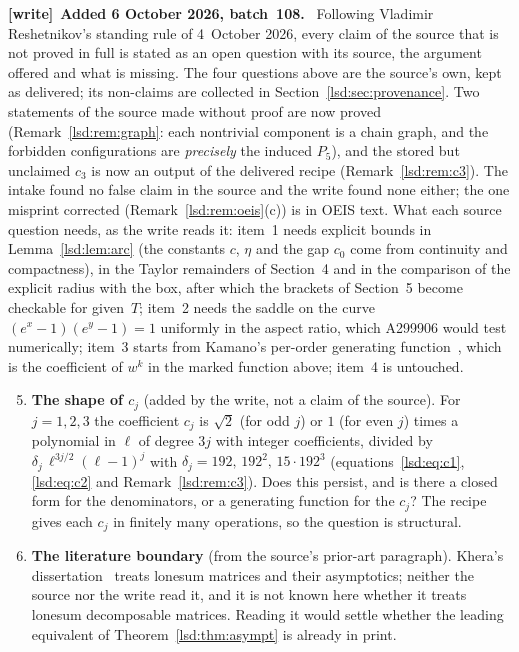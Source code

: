\documentclass[11pt]{article}
\theoremstyle{remark}\newtheorem{remark}{Remark}
\newenvironment{writenote}[1][]{\par\smallskip\begingroup\small
 \noindent\textbf{[write]}\if\relax\detokenize{#1}\relax\else~\textbf{#1.}\fi\ }%
 {\par\endgroup\smallskip}
\begin{document}
\begin{writenote}[Added 6 October 2026, batch~108]
Following Vladimir Reshetnikov's standing rule of 4~October 2026, every claim
of the source that is not proved in full is stated as an open question with
its source, the argument offered and what is missing. The four questions
above are the source's own, kept as delivered; its non-claims are collected in
Section~\ref{lsd:sec:provenance}. Two statements of the source made without
proof are now proved (Remark~\ref{lsd:rem:graph}: each nontrivial component is
a chain graph, and the forbidden configurations are \emph{precisely} the
induced $P_5$), and the stored but unclaimed $c_3$ is now an output of the
delivered recipe (Remark~\ref{lsd:rem:c3}). The intake found no false claim in
the source and the write found none either; the one misprint corrected
(Remark~\ref{lsd:rem:oeis}(c)) is in OEIS text. What each source question
needs, as the write reads it: item~1 needs explicit bounds in
Lemma~\ref{lsd:lem:arc} (the constants $c$, $\eta$ and the gap $c_0$ come from
continuity and compactness), in the Taylor remainders of Section~4 and in the
comparison of the explicit radius with the box, after which the brackets of
Section~5 become checkable for given~$T$; item~2 needs the saddle on the curve
$(e^x-1)(e^y-1)=1$ uniformly in the aspect ratio, which A299906 would test
numerically; item~3 starts from Kamano's per-order generating
function~\cite[Theorem~3.1, equation~(8)]{Kamano}, which is the coefficient of
$w^k$ in the marked function above; item~4 is untouched.
\end{writenote}
\begin{enumerate}
\setcounter{enumi}{4}
\item\label{lsd:q:pattern} \textbf{The shape of $c_j$} (added by the write,
 not a claim of the source). For $j=1,2,3$ the coefficient $c_j$ is
 $\sqrt2$ (for odd $j$) or $1$ (for even $j$) times a polynomial in $\ell$ of degree $3j$ with integer
 coefficients, divided by $\delta_j\,\ell^{3j/2}(\ell-1)^j$ with
 $\delta_j=192,\,192^2,\,15\cdot192^3$
 (equations~\eqref{lsd:eq:c1}, \eqref{lsd:eq:c2} and
 Remark~\ref{lsd:rem:c3}). Does this persist, and is there a closed form for
 the denominators, or a generating function for the $c_j$? The recipe gives
 each $c_j$ in finitely many operations, so the question is structural.
\item\label{lsd:q:literature} \textbf{The literature boundary} (from the
 source's prior-art paragraph). Khera's dissertation~\cite{KheraThesis}
 treats lonesum matrices and their asymptotics; neither the source nor the
 write read it, and it is not known here whether it treats lonesum
 decomposable matrices. Reading it would settle whether the leading
 equivalent of Theorem~\ref{lsd:thm:asympt} is already in print.
\end{enumerate}
\end{document}
